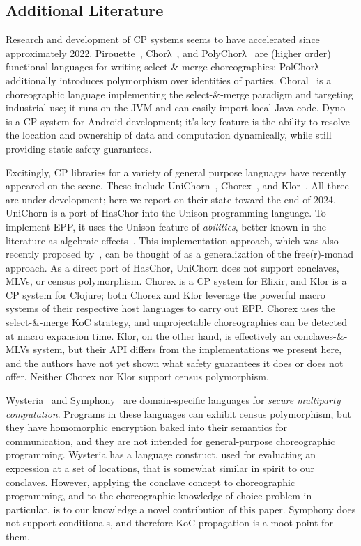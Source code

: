 \subsection{Additional Literature}
\label{sec:modern-work}

Research and development of CP systems seems to have accelerated since approximately 2022.
Pirouette~\cite{hirsch2021pirouette}, Chorλ~\cite{chor-lambda},
and  PolyChorλ~\cite{graversen2023polychor}
are (higher order) functional languages for writing select-\&-merge choreographies;
PolChorλ additionally introduces polymorphism over identities of parties.
Choral~\cite{giallorenzo-choral} is a choreographic language implementing the select-\&-merge paradigm
and targeting industrial use;
it runs on the JVM and can easily import local Java code.
Dyno~\cite{zakhour23} is a CP system for Android development;
it's key feature is the ability to resolve the location and ownership of data and computation dynamically,
while still providing static safety guarantees.

Excitingly, CP libraries for a variety of general purpose languages have recently appeared on the scene.
These include UniChorn~\cite{unichorn}, Chorex~\cite{chorex-github}, and Klor~\cite{klor-github}.
All three are under development; here we report on their state toward the end of 2024.
UniChorn is a port of HasChor into the Unison programming language.
To implement EPP, it uses the Unison feature of \emph{abilities}, better known in the literature as algebraic effects~\cite{plotkin-2003,plotkin-2013}.
This implementation approach, which was also recently proposed by~\cite{shen-alg-eff-cp},
can be thought of as a generalization of the free(r)-monad approach.
As a direct port of HasChor, UniChorn does not support conclaves, MLVs, or census polymorphism.
Chorex is a CP system for Elixir, and Klor is a CP system for Clojure;
both Chorex and Klor leverage the powerful macro systems of their respective host languages to carry out EPP.
Chorex uses the select-\&-merge KoC strategy, and unprojectable choreographies can be detected at macro expansion time.
Klor, on the other hand, is effectively an conclaves-\&-MLVs system, but their API differs from the implementations we present here,
and the authors have not yet shown what safety guarantees it does or does not offer.
Neither Chorex nor Klor support census polymorphism.

Wysteria~\cite{wysteria} and Symphony~\cite{Sweet_2023} are domain-specific languages for \emph{secure multiparty computation}.
Programs in these languages can exhibit census polymorphism,
but they have homomorphic encryption baked into their
semantics for communication,
and they are not intended for general-purpose choreographic programming.
Wysteria has a  language construct, used for evaluating an expression at a set of locations,
that is somewhat similar in spirit to our conclaves.
However, applying the conclave concept to choreographic programming, and to the choreographic knowledge-of-choice problem in particular,
is to our knowledge a novel contribution of this paper.
Symphony does not support conditionals, and therefore KoC propagation is a moot point for them.

